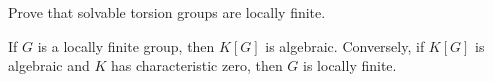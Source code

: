 


\begin{bonus}
    \label{bonus:solvable=>LF}
    Prove that solvable torsion groups are locally finite.  
\end{bonus}



\begin{theorem}[Herstein]
	If $G$ is a locally finite group, then $K[G]$ is algebraic. Conversely, if 
	$K[G]$ is algebraic and $K$ has characteristic zero, then $G$ 
	is locally finite. 
\end{theorem}

